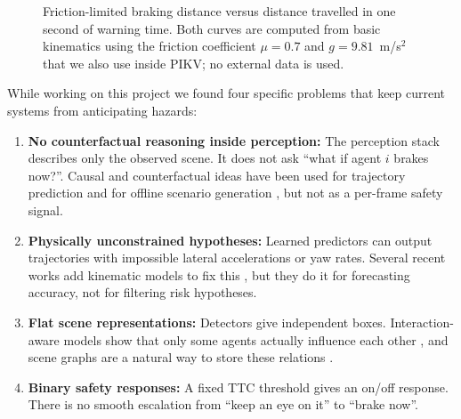 \documentclass[preprint,12pt]{elsarticle}
\begin{document}
\begin{figure}[H]
\centering
{}
\captionsetup{singlelinecheck = false, format= hang, justification=justified, font=footnotesize, labelsep=space}
\caption{Friction-limited braking distance versus distance travelled in one second of warning time. Both curves are computed from basic kinematics using the friction coefficient $\mu=0.7$ and $g=9.81$~m/s$^2$ that we also use inside PIKV; no external data is used.}
\label{fig_intro}
\end{figure}

While working on this project we found four specific problems that keep current systems from anticipating hazards:
\begin{enumerate}
    \item \textbf{No counterfactual reasoning inside perception:} The perception stack describes only the observed scene. It does not ask ``what if agent $i$ brakes now?''. Causal and counterfactual ideas have been used for trajectory prediction \cite{han2025cicr, wang2025beyond} and for offline scenario generation \cite{jing2026counterscene}, but not as a per-frame safety signal.
    \item \textbf{Physically unconstrained hypotheses:} Learned predictors can output trajectories with impossible lateral accelerations or yaw rates. Several recent works add kinematic models to fix this \cite{liao2024physics, baden2025tpk, chugh2025xtrack}, but they do it for forecasting accuracy, not for filtering risk hypotheses.
    \item \textbf{Flat scene representations:} Detectors give independent boxes. Interaction-aware models show that only some agents actually influence each other \cite{ahmadi2025critic}, and scene graphs are a natural way to store these relations \cite{hallyburton2025neuspaper}.
    \item \textbf{Binary safety responses:} A fixed TTC threshold gives an on/off response. There is no smooth escalation from ``keep an eye on it'' to ``brake now''.
\end{enumerate}
\end{document}
